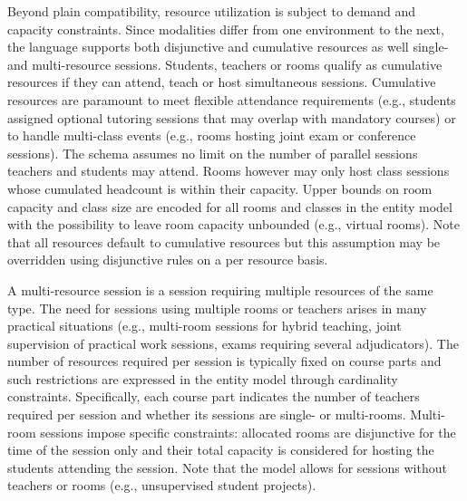 Beyond plain compatibility, resource utilization is subject to demand and capacity constraints.
Since modalities differ from one environment to the next, the language supports both disjunctive and cumulative resources as well single- and multi-resource sessions. 
Students, teachers or rooms qualify as cumulative resources if they 
can attend, teach or host simultaneous sessions. %
Cumulative resources are paramount to meet flexible attendance requirements (e.g., students assigned optional tutoring sessions that may overlap with mandatory courses) or to handle multi-class events (e.g., rooms hosting joint exam or conference sessions).
The schema assumes no limit on the number of parallel sessions teachers and students may attend.
Rooms however may only host class sessions whose cumulated headcount
is within their capacity.
Upper bounds on room capacity and class size are encoded for all rooms and classes in the entity model with the possibility to leave room capacity unbounded (e.g., virtual rooms). 
Note that all resources default to cumulative resources but this assumption may be overridden using disjunctive rules on a per resource basis.

A multi-resource session is a session requiring multiple resources of the same type. %
The need for sessions using multiple rooms or teachers arises in many practical situations (e.g., multi-room sessions for hybrid teaching, joint supervision of practical work sessions, exams requiring several adjudicators).
The number of resources required per session is typically fixed on course parts and  
such restrictions are expressed in the entity model through cardinality constraints. %
Specifically, each course part indicates the number of teachers required per session 
and whether its sessions are single- or multi-rooms.
Multi-room sessions impose specific constraints:
allocated rooms are disjunctive for the time of the session only and their total capacity is considered for hosting the students attending the session.
Note that the model allows for sessions without teachers or rooms (e.g., unsupervised student projects). 

